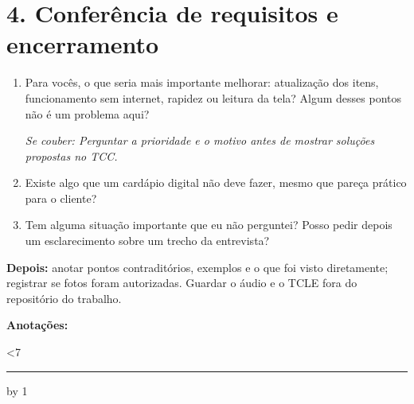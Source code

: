 \documentclass[11pt,a4paper]{article}
\newcommand{\aprofundar}[1]{\par{\small\color{gray}\textit{Se couber: #1}}}
\begin{document}
\section*{4. Conferência de requisitos e encerramento}
\begin{enumerate}[resume]
  \item Para vocês, o que seria mais importante melhorar: atualização dos itens, funcionamento sem internet, rapidez ou leitura da tela? Algum desses pontos não é um problema aqui?
    \aprofundar{Perguntar a prioridade e o motivo antes de mostrar soluções propostas no TCC.}
  \item Existe algo que um cardápio digital não deve fazer, mesmo que pareça prático para o cliente?
  \item Tem alguma situação importante que eu não perguntei? Posso pedir depois um esclarecimento sobre um trecho da entrevista?
\end{enumerate}

\textbf{Depois:} anotar pontos contraditórios, exemplos e o que foi visto diretamente; registrar se fotos foram autorizadas. Guardar o áudio e o TCLE fora do repositório do trabalho.

\vspace{0.6em}
\textbf{Anotações:}\par
\newcount\linhas {}
\loop\ifnum\linhas<7 \rule{\linewidth}{0.25pt}\par\vspace{0.55em}\advance\linhas by 1 \repeat
\end{document}
